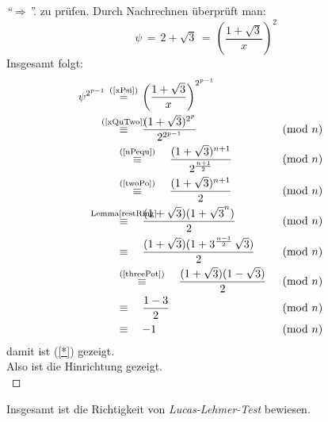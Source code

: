 \documentclass{article}
\begin{document}
\begin{proof}[``$\Rightarrow$'']
zu pr\"{u}fen.
Durch Nachrechnen \"{u}berpr\"{u}ft man:
\begin{equation}\label{xPsi}
	\psi \,= \,2+ \sqrt{3}\, = \,\left( \frac{1 + \sqrt{3}}{x} \right)^2
\end{equation}
Insgesamt folgt:
\begin{align*}
	 \psi^{2^{p-1}} \quad &\overset{\mathclap{\text{(\ref{xPsi})}}}{=} \quad \left( \frac{1 + \sqrt{3}}{x} \right)	^{2^{p-1}}\\
	 &\overset{\mathclap{\text{(\ref{xQuTwo})}}}{\equiv} \quad \frac{(1 + \sqrt{3})^{2^{p}}}{2^{2^{p-1}}} &&\pmod{n} \\
	 &\overset{\text{(\ref{nPequ})}}{\equiv} \quad \frac{(1 + \sqrt{3})^{n+1}}{2^{\frac{n+1}{2}}}&&\pmod{n}\\
	 &\overset{\text{(\ref{twoPo})}}{\equiv} \quad \frac{(1 + \sqrt{3})^{n+1}}{2} &&\pmod{n}\\
	 &\overset{\mathclap{\text{Lemma\ref{restRing}}}}{\equiv} \quad \frac{(1 + \sqrt{3})(1 + \sqrt{3}^{n})}{2} &&\pmod{n} \\
	 &\equiv \quad \frac{(1 + \sqrt{3})(1 + 3^{\frac{n-1}{2}}\,\sqrt{3})}{2} &&\pmod{n}\\
	 &\overset{\text{(\ref{threePot})}}{\equiv} \quad \frac{(1 + \sqrt{3})(1 - \sqrt{3})}{2} &&\pmod{n}\\
	 &\equiv \quad \frac{1 - 3}{2} &&\pmod{n}\\
	 &\equiv \quad -1 &&\pmod{n}
\end{align*}
damit ist (\ref{*}) gezeigt. \\Also ist die Hinrichtung gezeigt.\\
\end{proof}
Insgesamt ist die Richtigkeit von \emph{Lucas-Lehmer-Test} bewiesen.
\newpage

\newpage


\end{document}

